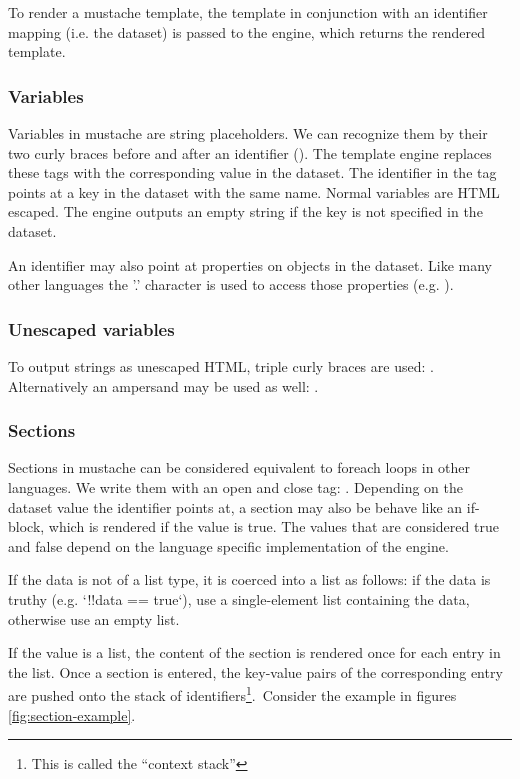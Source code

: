 \documentclass[thesis.tex]{subfiles}
\begin{document}
To render a mustache template, the template in conjunction with an
identifier mapping (i.e. the dataset) is passed to the engine, which returns the
rendered template.

\subsubsection{Variables}
\label{sect:mustache-vars}
Variables in mustache are string placeholders. We can recognize them by their
two curly braces before and after an identifier ().
The template engine replaces these tags with the corresponding value in the
dataset.
The identifier in the tag points at a key in the dataset with the same name.
Normal variables are HTML escaped. The engine outputs an empty string if the
key is not specified in the dataset.

An identifier may also point at properties on objects in the dataset. Like many
other languages the '.' character is used to access those properties (e.g. ).

\subsubsection{Unescaped variables}
To output strings as unescaped HTML, triple curly braces are used:
. Alternatively an ampersand may be used as well:
.

\subsubsection{Sections}
Sections in mustache can be considered equivalent to foreach loops in other
languages. We write them with an open and close tag:
.
Depending on the dataset value the identifier points at, a section may also be
behave like an if-block, which is rendered if the value is true. The values that
are considered true and false depend on the language specific implementation
of the engine.
\begin{citequote}{\cite[sections.yml]{MSTSPEC}}
	If the data is not of a list type, it is coerced into a list as follows: if
	the data is truthy (e.g. `!!data == true`), use a single-element list
	containing the data, otherwise use an empty list.
\end{citequote}
If the value is a list, the content of the section is rendered once for each
entry in the list. Once a section is entered, the key-value pairs of the
corresponding entry are pushed onto the stack of identifiers\footnote{
	This is called the ``context stack''
}.\
Consider the example in figures \ref{fig:section-example}.
\end{document}
